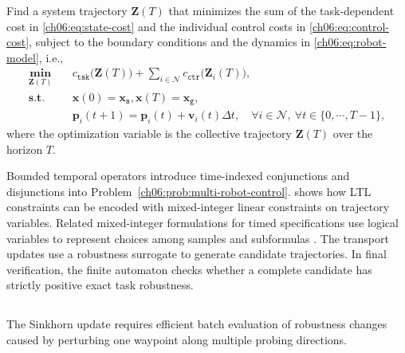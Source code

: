\begin{problem}
\label{ch06:prob:multi-robot-control}
Find a system trajectory $\mathbf{Z}(T)$ that minimizes the sum of the
task-dependent cost in \eqref{ch06:eq:state-cost} and the individual control
costs in \eqref{ch06:eq:control-cost}, subject to the boundary conditions and
the dynamics in \eqref{ch06:eq:robot-model}, i.e.,
\begin{equation}
\label{ch06:eq:prob}
\begin{aligned}
\underset{\mathbf{Z}(T)}{\textbf{min}}\quad
& c_{\texttt{tsk}}\big(\mathbf{Z}(T)\big)
+ \sum_{i\in\mathcal{N}} c_{\texttt{ctr}}\big(\mathbf{Z}_i(T)\big), \\
\textbf{s.t.}\quad
& \mathbf{x}(0)=\mathbf{x}_{\texttt{s}}, \mathbf{x}(T)=\mathbf{x}_{\texttt{g}}, \\
& \mathbf{p}_i(t+1)=\mathbf{p}_i(t)+\mathbf{v}_i(t)\Delta t,
\quad \forall i\in\mathcal{N},\ \forall t\in\{0,\cdots,T-1\},
\end{aligned}
\end{equation}
where the optimization variable is the collective trajectory
$\mathbf{Z}(T)$ over the horizon $T$.
\end{problem}

\begin{revision}
Bounded temporal operators introduce time-indexed conjunctions and
disjunctions into Problem~\ref{ch06:prob:multi-robot-control}.
\citet{wolff2014control} shows how LTL constraints can be encoded
with mixed-integer linear constraints on trajectory variables.
Related mixed-integer formulations for timed specifications use logical
variables to represent choices among samples and subformulas
\citep{sun2022multiagent,kurtz2022mixed}. The transport updates use a
robustness surrogate to generate candidate trajectories. In final verification,
the finite automaton checks whether a complete candidate has strictly positive
exact task robustness.
\end{revision}


\subsection{}
\label{ch06:subsec:batch-stl}

The Sinkhorn update requires efficient batch evaluation of robustness changes
caused by perturbing one waypoint along multiple probing directions.

